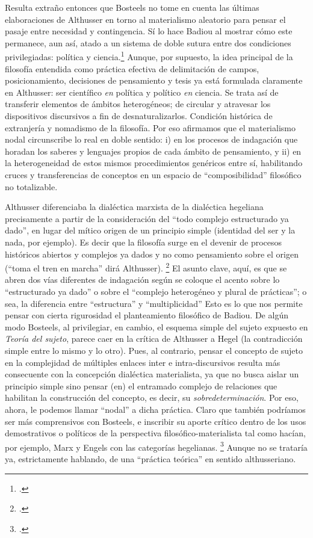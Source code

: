Resulta extraño entonces que Bosteels no tome en cuenta las últimas elaboraciones de Althusser en torno al materialismo aleatorio para pensar el pasaje entre necesidad y contingencia. Sí lo hace Badiou al mostrar cómo este permanece, aun así, atado  a un sistema de doble sutura entre dos condiciones privilegiadas: política y ciencia.\footcite[][59-86]{@7010-BADIOU2009} Aunque, por supuesto, la idea principal de la filosofía entendida como práctica efectiva de delimitación de campos, posicionamiento, decisiones de pensamiento y tesis ya está formulada claramente en Althusser: ser científico \emph{en} política y político \emph{en} ciencia. Se trata así de transferir elementos de ámbitos heterogéneos; de circular y atravesar los dispositivos discursivos a fin de desnaturalizarlos. Condición histórica de extranjería y nomadismo de la filosofía. Por eso afirmamos que el materialismo nodal circunscribe lo real en doble sentido: i) en los procesos de indagación que horadan los saberes y lenguajes propios de cada ámbito de pensamiento, y ii) en la heterogeneidad de estos mismos procedimientos genéricos entre sí, habilitando cruces y transferencias de conceptos en un espacio de \enquote{composibilidad} filosófico no totalizable.

Althusser diferenciaba la dialéctica marxista de la dialéctica hegeliana precisamente a partir de la consideración del \enquote{todo complejo estructurado ya dado}, en lugar del mítico origen de un principio simple (identidad del ser y la nada, por ejemplo). Es decir que la filosofía surge en el devenir de procesos históricos abiertos y complejos ya dados  y no como pensamiento sobre el origen (\enquote{toma el tren en marcha} dirá Althusser). \footcite[Véase][]{@7014-ALTHUSSER2002} El asunto clave, aquí, es que se abren dos vías diferentes de indagación según se coloque el acento sobre lo \enquote{estructurado ya dado} o sobre el \enquote{complejo heterogéneo y plural de prácticas}; o sea, la diferencia entre \enquote{estructura} y \enquote{multiplicidad} Esto es lo que nos permite pensar con cierta rigurosidad el planteamiento filosófico de Badiou. De algún modo Bosteels, al privilegiar, en cambio, el esquema simple del sujeto expuesto en \emph{Teoría del sujeto}, parece caer en la crítica de Althusser a Hegel (la contradicción simple entre lo mismo y lo otro). Pues, al contrario, pensar el concepto de sujeto en la complejidad de múltiples enlaces inter e intra-discursivos  resulta más consecuente con la concepción dialéctica materialista, ya que no busca aislar un principio simple sino pensar (en) el entramado complejo de relaciones que habilitan la construcción del concepto, es decir, su \emph{sobredeterminación}. Por eso, ahora, le podemos llamar \enquote{nodal} a dicha práctica. Claro que también podríamos ser más comprensivos con Bosteels, e inscribir su aporte crítico dentro de los usos demostrativos o políticos de la perspectiva filosófico-materialista tal como hacían, por ejemplo, Marx y Engels con las categorías hegelianas. \footcite[Véase][165]{@7051-ALTHUSSER1965}
 Aunque no se trataría ya, estrictamente hablando, de una \enquote{práctica teórica} en sentido althusseriano.

